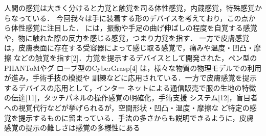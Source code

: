 \documentclass[11pt,onecolumn]{jsarticle}
\begin{document}
人間の感覚は大きく分けると力覚と触覚を司る体性感覚，内蔵感覚，特殊感覚からなっている．
今回我々は手に装着する形のデバイスを考えており，この点から体性感覚に注目した．
には，振動や手足の曲げ伸ばしの程度を自覚する感覚や，物に触れた際の反力を感じる感覚，つまり力覚を指す．
一方で皮膚感覚は，皮膚表面に存在する受容器によって感じ取る感覚で，痛みや温度・凹凸・摩擦
などの触覚を指す[2]．力覚を提示するデバイスとして開発された，ペン型のPHANToMやグ
ローブ型のCyberGrasp[4] は，様々な物質の物理モデルでの利用が進み，手術手技の模擬や
訓練などに応用されている．一方で皮膚感覚を提示するデバイスの応用として，インター
ネットによる通信販売で服の生地の特徴の伝達[11]，タッチパネルの操作感覚の明確化，手術支援
システム[12]，盲目者への視覚代行などが挙げられるが，空間形状・凹凸・温度・摩擦な
ど特定の感覚を提示するものに留まっている．手法の多さからも説明できるように，皮膚
感覚の提示の難しさは感覚の多様性にある

\end{document}
